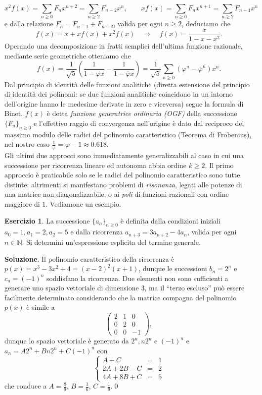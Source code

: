 \documentclass[a4paper,twoside]{article}
\newcommand{\N}{\mathbb{N}}
\theoremstyle{definition}
\newtheorem{ex}[theorem]{Esercizio}
\numberwithin{theorem}{section}
\begin{document}
$$ x^2 f(x) = \sum_{n\geq 0} F_n x^{n+2} = \sum_{n\geq 2} F_{n-2} x^n,\qquad x f(x) = \sum_{n\geq 0} F_n x^{n+1} = \sum_{n\geq 2} F_{n-1} x^n $$
e dalla relazione $F_{n}=F_{n-1}+F_{n-2}$, valida per ogni $n\geq 2$, deduciamo che 
$$ f(x) = x + x f(x) + x^2 f(x)\quad\Longrightarrow\quad f(x) = \frac{x}{1-x-x^2}. $$
Operando una decomposizione in fratti semplici dell'ultima funzione razionale, mediante serie geometriche otteniamo che 
$$ f(x) = \frac{1}{\sqrt{5}}\left(\frac{1}{1-\varphi x}-\frac{1}{1-\overline{\varphi}x}\right) = \frac{1}{\sqrt{5}}\sum_{n\geq 0}\left(\varphi^n-\overline{\varphi}^n\right) x^n. $$
Dal principio di identità delle funzioni analitiche (diretta estensione del principio di identità dei polinomi: se due funzioni analitiche coincidono in un intorno dell'origine hanno le medesime derivate in zero e viceversa) segue la formula di Binet. $f(x)$ è detta \emph{funzione generatrice ordinaria (OGF)} della successione $\{F_n\}_{n\geq 0}$ e l'effettivo raggio di convergenza nell'origine è dato dal reciproco del massimo modulo delle radici del polinomio caratteristico (Teorema di Frobenius), nel nostro caso $\frac{1}{\varphi}=\varphi-1\approx 0.618$.\\

Gli ultimi due approcci sono immediatamente generalizzabili al caso in cui una successione per ricorrenza lineare ed autonoma abbia ordine $k\geq 2$. Il primo approccio è praticabile solo se le radici del polinomio caratteristico sono tutte distinte: altrimenti si manifestano problemi di \emph{risonanza}, legati alle potenze di una matrice non diagonalizzabile, o ai \emph{poli} di funzioni razionali con ordine maggiore di $1$. Vediamone un esempio.

\begin{ex} La successione $\{a_n\}_{n\geq 0}$ è definita dalla condizioni iniziali $a_0=1, a_1=2, a_2=5$ e dalla ricorrenza $a_{n+3}=3 a_{n+2}-4 a_n$, valida per ogni $n\in\N$. Si determini un'espressione esplicita del termine generale. 
\end{ex}

\textbf{Soluzione}. Il polinomio caratteristico della ricorrenza è $p(x)=x^3-3x^2+4=(x-2)^2(x+1)$, dunque le successioni $b_n=2^n$ e $c_n=(-1)^n$ soddisfano la ricorrenza. Due elementi non sono sufficienti a generare uno spazio vettoriale di dimensione $3$, ma il ``terzo escluso'' può essere facilmente determinato considerando che la matrice compagna del polinomio $p(x)$ è simile a 
$$\begin{pmatrix} 2 & 1 & 0 \\ 0 & 2 & 0 \\ 0 & 0 & -1\end{pmatrix}, $$
dunque lo spazio vettoriale è generato da $2^n, n 2^n$ e $(-1)^n$ e $a_n = A 2^n + B n 2^n + C(-1)^n$ con 
$$\left\{\begin{array}{rcl}A+C&=& 1 \\ 2A+2B-C&=& 2 \\ 4A+8B+C&=&5\end{array}\right. $$
che conduce a $A=\frac{8}{9}$, $B=\frac{1}{6}$, $C=\frac{1}{9}$.\qed
\end{document}
